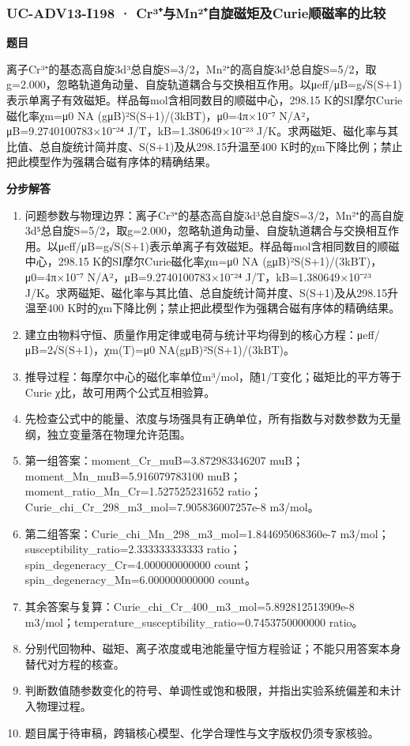 \documentclass[UTF8,11pt,a4paper]{ctexart}
\begin{document}
\subsubsection*{UC-ADV13-I198 · Cr³⁺与Mn²⁺自旋磁矩及Curie顺磁率的比较}
\noindent\textbf{题目}\par
离子Cr³⁺的基态高自旋3d³总自旋S=3/2，Mn²⁺的高自旋3d⁵总自旋S=5/2，取g=2.000，忽略轨道角动量、自旋轨道耦合与交换相互作用。以μeff/μB=g√S(S+1)表示单离子有效磁矩。样品每mol含相同数目的顺磁中心，298.15 K的SI摩尔Curie磁化率χm=μ0 NA (gμB)²S(S+1)/(3kBT)，μ0=4π×10⁻⁷ N/A²，μB=9.2740100783×10⁻²⁴ J/T，kB=1.380649×10⁻²³ J/K。求两磁矩、磁化率与其比值、总自旋统计简并度、S(S+1)及从298.15升温至400 K时的χm下降比例；禁止把此模型作为强耦合磁有序体的精确结果。\par
\medskip\noindent\textbf{分步解答}
\begin{enumerate}
\item 问题参数与物理边界：离子Cr³⁺的基态高自旋3d³总自旋S=3/2，Mn²⁺的高自旋3d⁵总自旋S=5/2，取g=2.000，忽略轨道角动量、自旋轨道耦合与交换相互作用。以μeff/μB=g√S(S+1)表示单离子有效磁矩。样品每mol含相同数目的顺磁中心，298.15 K的SI摩尔Curie磁化率χm=μ0 NA (gμB)²S(S+1)/(3kBT)，μ0=4π×10⁻⁷ N/A²，μB=9.2740100783×10⁻²⁴ J/T，kB=1.380649×10⁻²³ J/K。求两磁矩、磁化率与其比值、总自旋统计简并度、S(S+1)及从298.15升温至400 K时的χm下降比例；禁止把此模型作为强耦合磁有序体的精确结果。
\item 建立由物料守恒、质量作用定律或电荷与统计平均得到的核心方程：μeff/μB=2√S(S+1)，χm(T)=μ0 NA(gμB)²S(S+1)/(3kBT)。
\item 推导过程：每摩尔中心的磁化率单位m³/mol，随1/T变化；磁矩比的平方等于Curie χ比，故可用两个公式互相验算。
\item 先检查公式中的能量、浓度与场强具有正确单位，所有指数与对数参数为无量纲，独立变量落在物理允许范围。
\item 第一组答案：moment\_Cr\_muB=3.872983346207 muB；moment\_Mn\_muB=5.916079783100 muB；moment\_ratio\_Mn\_Cr=1.527525231652 ratio；Curie\_chi\_Cr\_298\_m3\_mol=7.905836007257e-8 m3/mol。
\item 第二组答案：Curie\_chi\_Mn\_298\_m3\_mol=1.844695068360e-7 m3/mol；susceptibility\_ratio=2.333333333333 ratio；spin\_degeneracy\_Cr=4.000000000000 count；spin\_degeneracy\_Mn=6.000000000000 count。
\item 其余答案与复算：Curie\_chi\_Cr\_400\_m3\_mol=5.892812513909e-8 m3/mol；temperature\_susceptibility\_ratio=0.7453750000000 ratio。
\item 分别代回物种、磁矩、离子浓度或电池能量守恒方程验证；不能只用答案本身替代对方程的核查。
\item 判断数值随参数变化的符号、单调性或饱和极限，并指出实验系统偏差和未计入物理过程。
\item 题目属于待审稿，跨辑核心模型、化学合理性与文字版权仍须专家核验。
\end{enumerate}
\end{document}
